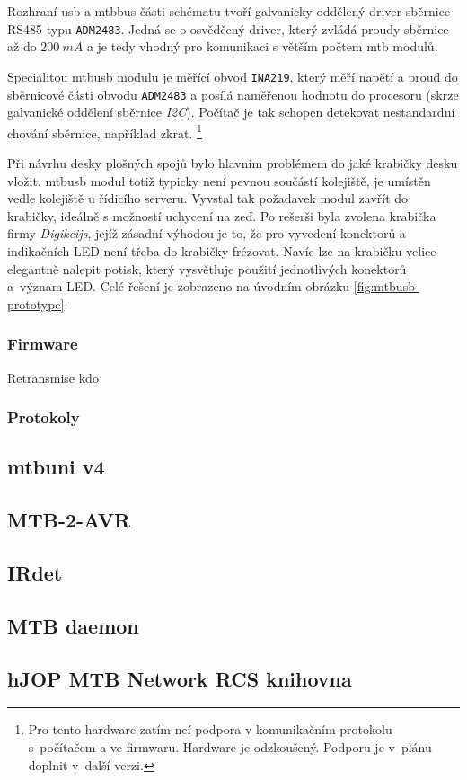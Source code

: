 Rozhraní \gls{usb} a \gls{mtbbus} části schématu tvoří galvanicky oddělený
driver sběrnice RS485 typu \texttt{ADM2483}. Jedná se o osvědčený driver,
který zvládá proudy sběrnice až do $200~mA$ \cite{adm2483-datasheet} a je tedy
vhodný pro komunikaci s větším počtem \gls{mtb} modulů.

Specialitou \gls{mtbusb} modulu je měřící obvod \texttt{INA219}, který měří
napětí a proud do sběrnicové části obvodu \texttt{ADM2483} a posílá naměřenou
hodnotu do procesoru (skrze galvanické oddělení sběrnice \textit{I2C}). Počítač
je tak schopen detekovat nestandardní chování sběrnice, například zkrat.
\footnote{Pro tento hardware zatím neí podpora v komunikačním protokolu
s~počítačem a ve firmwaru. Hardware je odzkoušený. Podporu je v~plánu doplnit
v~další verzi.}

Při návrhu desky plošných spojů bylo hlavním problémem do jaké krabičky desku
vložit. \gls{mtbusb} modul totiž typicky není pevnou součástí kolejiště, je
umístěn vedle kolejiště u řídicího serveru. Vyvstal tak požadavek modul zavřít
do krabičky, ideálně s možností uchycení na zeď. Po rešerši byla zvolena krabička
firmy \textit{Digikeijs}, jejíž zásadní výhodou je to, že pro vyvedení konektorů
a indikačních LED není třeba do krabičky frézovat. Navíc lze na krabičku velice
elegantně nalepit potisk, který vysvětluje použití jednotlivých konektorů
a~význam LED. Celé řešení je zobrazeno na úvodním obrázku
\ref{fig:mtbusb-prototype}.


\subsubsection{Firmware}

Retransmise kdo

\subsubsection{Protokoly}

\subsection{\gls{mtbuni} v4}


\subsection{MTB-2-AVR}


\subsection{IRdet}


\subsection{MTB daemon}


\subsection{hJOP MTB Network RCS knihovna}
